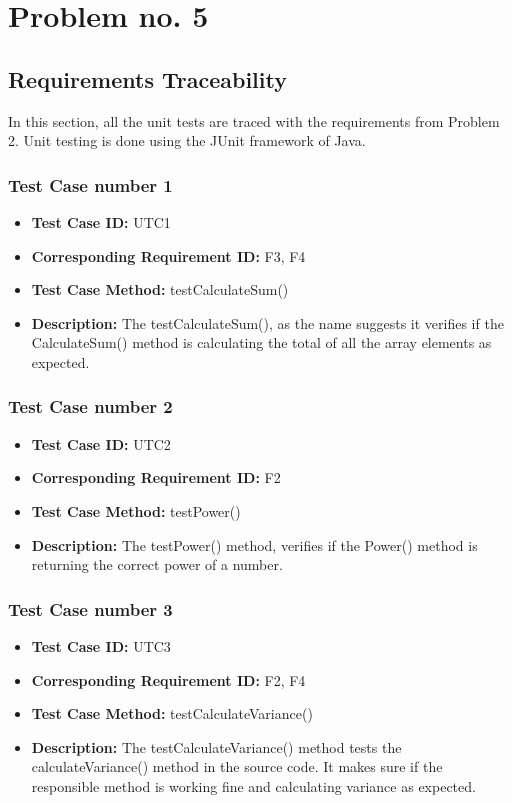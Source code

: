 \documentclass[12pt,a4paper]{report}
\begin{document}
\chapter{Problem no. 5}
\section{Requirements Traceability}
In this section, all the unit tests are traced with the requirements from Problem 2. Unit testing is done using the JUnit framework of Java. 

\subsection*{Test Case number 1}
    \begin{itemize}
        \item \textbf{Test Case ID: } UTC1
        \item \textbf{Corresponding Requirement ID: } F3, F4
        \item \textbf{Test Case Method: } testCalculateSum()
        \item \textbf{Description: } The testCalculateSum(), as the name suggests it verifies if the CalculateSum() method is calculating the total of all the array elements as expected. 
    \end{itemize}
    
\subsection*{Test Case number 2}
    \begin{itemize}
        \item \textbf{Test Case ID: } UTC2
        \item \textbf{Corresponding Requirement ID: } F2
        \item \textbf{Test Case Method: } testPower()
        \item \textbf{Description: } The testPower() method, verifies if the Power() method is returning the correct power of a number. 
    \end{itemize}
    
\subsection*{Test Case number 3}
    \begin{itemize}
        \item \textbf{Test Case ID: } UTC3
        \item \textbf{Corresponding Requirement ID: } F2, F4
        \item \textbf{Test Case Method: } testCalculateVariance()
        \item \textbf{Description: } The testCalculateVariance() method tests the calculateVariance() method in the source code. It makes sure if the responsible method is working fine and calculating variance as expected. 
    \end{itemize}
    
\end{document}
